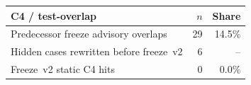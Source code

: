 \begin{tabular}{lrr}
\toprule
\textbf{C4 / test-overlap} & \textbf{$n$} & \textbf{Share} \\
\midrule
Predecessor freeze advisory overlaps & 29 & 14.5\% \\
Hidden cases rewritten before freeze~v2 & 6 & -- \\
Freeze~v2 static C4 hits & 0 & 0.0\% \\
\bottomrule
\end{tabular}

